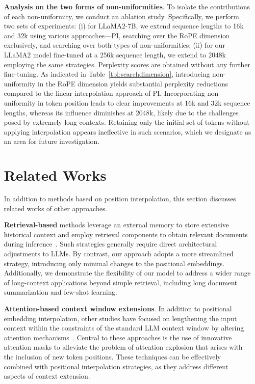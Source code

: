 \textbf{Analysis on the two forms of non-uniformities}. To isolate the contributions of each non-uniformity, we conduct an ablation study. Specifically, we perform two sets of experiments: (i) for LLaMA2-7B, we extend sequence lengths to 16k and 32k using various approaches—PI, searching over the RoPE dimension exclusively, and searching over both types of non-uniformities; (ii) for our LLaMA2 model fine-tuned at a 256k sequence length, we extend to 2048k employing the same strategies. Perplexity scores are obtained without any further fine-tuning. As indicated in Table~\ref{tbl:searchdimension}, introducing non-uniformity in the RoPE dimension yields substantial perplexity reductions compared to the linear interpolation approach of PI. Incorporating non-uniformity in token position leads to clear improvements at 16k and 32k sequence lengths, whereas its influence diminishes at 2048k, likely due to the challenges posed by extremely long contexts. Retaining only the initial set of tokens without applying interpolation appears ineffective in such scenarios, which we designate as an area for future investigation.

\section{Related Works}

In addition to methods based on position interpolation, this section discusses related works of other approaches. 

\textbf{Retrieval-based} methods leverage an external memory to store extensive historical context and employ retrieval components to obtain relevant documents during inference~\cite{longllama,wang2023augmenting,borgeaud2022improving}. Such strategies generally require direct architectural adjustments to LLMs. By contrast, our approach adopts a more streamlined strategy, introducing only minimal changes to the positional embeddings. Additionally, we demonstrate the flexibility of our model to address a wider range of long-context applications beyond simple retrieval, including long document summarization and few-shot learning.

\textbf{Attention-based context window extensions}. In addition to positional embedding interpolation, other studies have focused on lengthening the input context within the constraints of the standard LLM context window by altering attention mechanisms~\cite{han2023lminfinite, streamingllm,parallelwindow}. Central to these approaches is the use of innovative attention masks to alleviate the problem of attention explosion that arises with the inclusion of new token positions. These techniques can be effectively combined with positional interpolation strategies, as they address different aspects of context extension.

